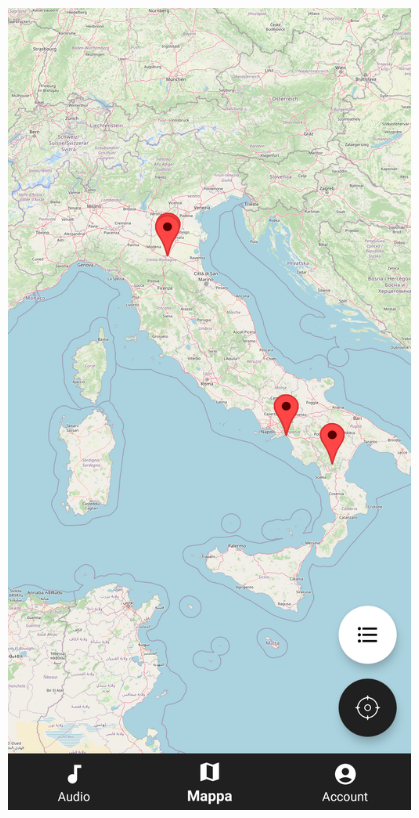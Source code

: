 \documentclass{article}
\begin{document}
\begin{minipage}[t]{0.35\textwidth}
    \centering
    \vspace*{10pt}
    \includegraphics[width=0.8\textwidth]{mappa.png}\vspace*{40pt}
\end{minipage}
\end{document}
